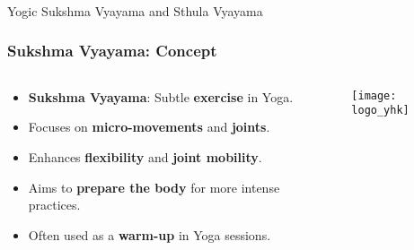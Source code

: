 \begin{frame}[fragile]\frametitle{}
\begin{center}
{\Large Yogic Sukshma  Vyayama and Sthula Vyayama}
\end{center}
\end{frame}

\begin{frame}[fragile]\frametitle{Sukshma Vyayama: Concept}
\begin{columns}
    \begin{column}[T]{0.5\linewidth}
      \begin{itemize}
        \item \textbf{Sukshma Vyayama}: Subtle \textbf{exercise} in Yoga.
        \item Focuses on \textbf{micro-movements} and \textbf{joints}.
        \item Enhances \textbf{flexibility} and \textbf{joint mobility}.
        \item Aims to \textbf{prepare the body} for more intense practices.
        \item Often used as a \textbf{warm-up} in Yoga sessions.
      \end{itemize}
    \end{column}
    \begin{column}[T]{0.5\linewidth}
        \begin{center}
        \texttt{[image: logo\_yhk]}
        \end{center}	
    \end{column}
\end{columns}
\end{frame}

